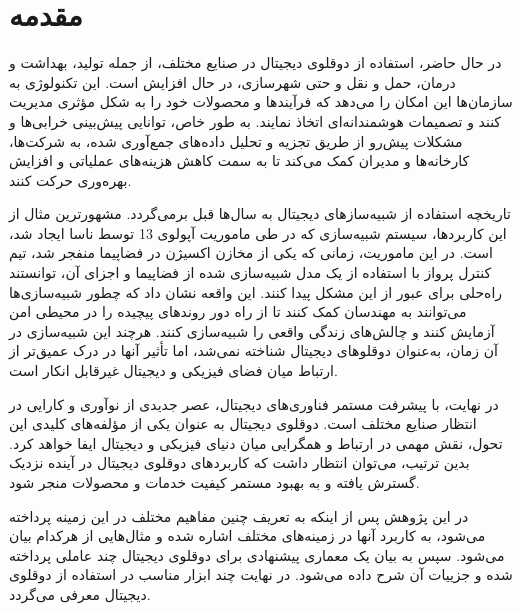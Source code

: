 \chapter{مقدمه}


در حال حاضر، استفاده از دوقلوی دیجیتال در صنایع مختلف، از جمله تولید، بهداشت و درمان، حمل و نقل و حتی شهرسازی، در حال افزایش است. این تکنولوژی به سازمان‌ها این امکان را می‌دهد که فرآیندها و محصولات خود را به شکل مؤثری مدیریت کنند و تصمیمات هوشمندانه‌ای اتخاذ نمایند. به طور خاص، توانایی پیش‌بینی خرابی‌ها و مشکلات پیش‌رو از طریق تجزیه و تحلیل داده‌های جمع‌آوری شده، به شرکت‌ها، کارخانه‌ها و مدیران کمک می‌کند تا به سمت کاهش هزینه‌های عملیاتی و افزایش بهره‌وری حرکت کنند.


تاریخچه استفاده از شبیه‌ساز‌های دیجیتال به سال‌ها قبل برمی‌گردد. مشهورترین مثال از این کاربردها، سیستم شبیه‌سازی که در طی ماموریت آپولوی 13 توسط ناسا ایجاد شد، است. در این ماموریت، زمانی که یکی از مخازن اکسیژن در فضاپیما منفجر شد، تیم کنترل پرواز با استفاده از یک مدل شبیه‌سازی شده از فضاپیما و اجزای آن، توانستند راه‌حلی برای عبور از این مشکل پیدا کنند. این واقعه نشان داد که چطور شبیه‌سازی‌ها می‌توانند به مهندسان کمک کنند تا از راه دور روندهای پیچیده را در محیطی امن آزمایش کنند و چالش‌های زندگی واقعی را شبیه‌سازی کنند. هرچند این شبیه‌سازی در آن زمان، به‌عنوان دوقلوهای دیجیتال شناخته نمی‌شد، اما تأثیر آنها در درک عمیق‌تر از ارتباط میان فضای فیزیکی و دیجیتال غیرقابل انکار است.
\cite{b3}

در نهایت، با پیشرفت مستمر فناوری‌های دیجیتال، عصر جدیدی از نوآوری و کارایی در انتظار صنایع مختلف است. دوقلوی دیجیتال به عنوان یکی از مؤلفه‌های کلیدی این تحول، نقش مهمی در ارتباط و همگرایی میان دنیای فیزیکی و دیجیتال ایفا خواهد کرد. بدین ترتیب، می‌توان انتظار داشت که کاربردهای دوقلوی دیجیتال در آینده نزدیک گسترش یافته و به بهبود مستمر کیفیت خدمات و محصولات منجر شود.

در این پژوهش پس از اینکه به تعریف چنین مفاهیم مختلف در این زمینه پرداخته می‌شود، به کاربرد آنها در زمینه‌های مختلف اشاره شده و مثال‌هایی از هرکدام بیان می‌شود. سپس به بیان یک معماری پیشنهادی برای دوقلوی دیجیتال چند عاملی پرداخته شده و جزییات آن شرح داده می‌شود. در نهایت چند ابزار مناسب در استفاده از دوقلوی دیجیتال معرفی می‌گردد.


